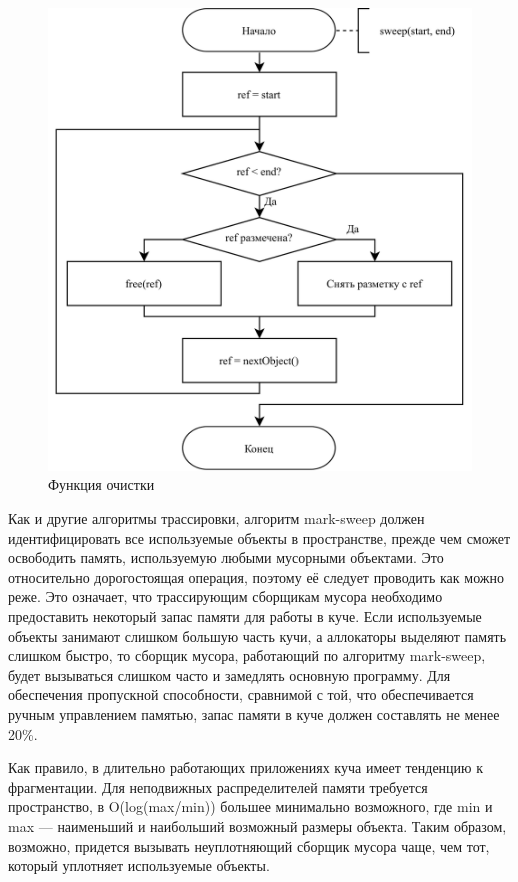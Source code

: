 \begin{figure}[H]
	\centering
	\includegraphics[scale=0.175]{assets/mark-sweep-3.png}
	\caption{Функция очистки}
	\label{fig:mark-sweep-3}
\end{figure}

Как и другие алгоритмы трассировки, алгоритм mark-sweep должен идентифицировать все используемые объекты в пространстве, прежде чем сможет освободить память, используемую любыми мусорными объектами. Это относительно дорогостоящая операция, поэтому её следует проводить как можно реже. Это означает, что трассирующим сборщикам мусора необходимо предоставить некоторый запас памяти для работы в куче. Если используемые объекты занимают слишком большую часть кучи, а аллокаторы выделяют память слишком быстро, то сборщик мусора, работающий по алгоритму mark-sweep, будет вызываться слишком часто и замедлять основную программу. Для обеспечения пропускной способности, сравнимой с той, что обеспечивается ручным управлением памятью, запас памяти в куче должен составлять не менее 20\%. \cite{handbook}

Как правило, в длительно работающих приложениях куча имеет тенденцию к фрагментации. Для неподвижных распределителей памяти требуется пространство, в O(log(max/min)) большее минимально возможного, где min и max --- наименьший и наибольший возможный размеры объекта. Таким образом, возможно, придется вызывать неуплотняющий сборщик мусора чаще, чем тот, который уплотняет используемые объекты. \cite{handbook}


